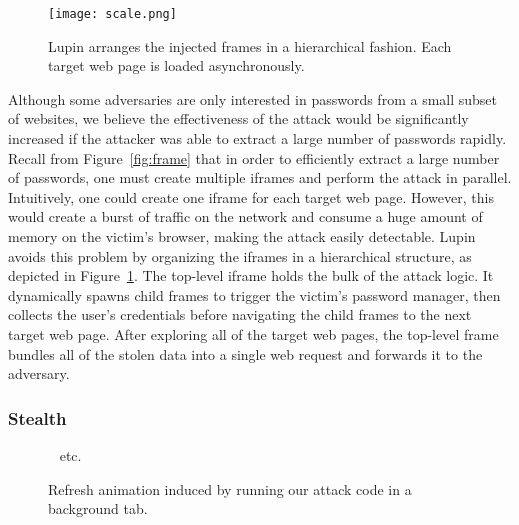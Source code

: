 \documentclass[letterpaper,twocolumn,10pt]{article}
\begin{document}
\begin{figure}[ht]
\begin{center}
	
\texttt{[image: scale.png]}
\end{center}
\caption{Lupin arranges the injected frames in a hierarchical fashion. 
Each target web page is loaded asynchronously.}
\label{fig:scale}
\end{figure}

Although some adversaries are only interested in passwords from a 
small subset of websites, we believe the effectiveness of the attack 
would be significantly increased if the attacker was able to extract a 
large number of passwords rapidly. Recall from Figure~\ref{fig:frame} that 
in order to efficiently extract a large number of passwords, one must 
create multiple iframes and perform the attack in parallel. 
Intuitively, one could create one iframe for each target web page. 
However, this would create a burst of traffic on the network and consume 
a huge amount of memory on the victim's browser, making 
the attack easily detectable. Lupin avoids this problem by organizing 
the iframes in a hierarchical structure, as depicted in 
Figure~\ref{fig:scale}. The top-level iframe holds the bulk of the 
attack logic. It dynamically spawns child frames to trigger the 
victim's password manager, then collects the user's credentials before 
navigating the child frames to the next target web page. After 
exploring all of the target web pages, the top-level frame bundles all 
of the stolen data into a single web request and forwards it to the 
adversary.


\subsubsection{Stealth}
\label{sec:stealth}

\begin{figure*}[ht]
		\centering
		~ etc. 

        \caption[]{Refresh animation induced by running our attack 
code in a background tab.}
		\label{fig:refresh}
\end{figure*}
\end{document}
